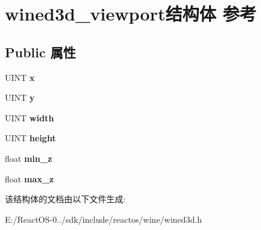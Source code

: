 \hypertarget{structwined3d__viewport}{}\section{wined3d\+\_\+viewport结构体 参考}
\label{structwined3d__viewport}
\subsection*{Public 属性}
\begin{DoxyCompactItemize}
\item 
\mbox{\label{structwined3d__viewport_a5f4400e15413ce5574246cf20da8d0c6}} 
U\+I\+NT {\bfseries x}
\item 
\mbox{\label{structwined3d__viewport_a5ea374657f628d5818dff91bf2fbfafd}} 
U\+I\+NT {\bfseries y}
\item 
\mbox{\label{structwined3d__viewport_aee2dc098fa40df910e950f571acd49ec}} 
U\+I\+NT {\bfseries width}
\item 
\mbox{\label{structwined3d__viewport_ac124a8caac2aff87f1f9712b9eab9585}} 
U\+I\+NT {\bfseries height}
\item 
\mbox{\label{structwined3d__viewport_aee3f8d49f918fd366118a6e4a6760b0f}} 
float {\bfseries min\+\_\+z}
\item 
\mbox{\label{structwined3d__viewport_acb218c903286474547a5994d42d655da}} 
float {\bfseries max\+\_\+z}
\end{DoxyCompactItemize}


该结构体的文档由以下文件生成\+:\begin{DoxyCompactItemize}
\item 
E\+:/\+React\+O\+S-\/0../sdk/include/reactos/wine/wined3d.\+h\end{DoxyCompactItemize}
